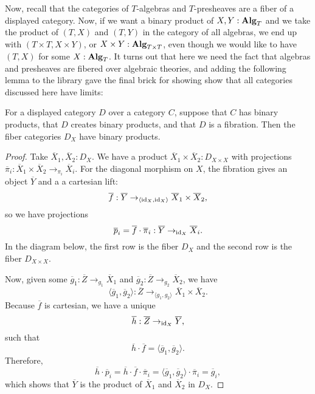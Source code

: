 Now, recall that the categories of $ T $-algebras and $ T $-presheaves are a fiber of a displayed category. Now, if we want a binary product of $ X, Y : \mathbf{Alg}_{T} $ and we take the product of $ (T, X) $ and $ (T, Y) $ in the category of all algebras, we end up with $ (T \times T, X \times Y) $, or $ X \times Y : \mathbf{Alg}_{T \times T} $, even though we would like to have $ (T, X) $ for some $ X : \mathbf{Alg}_{T} $. It turns out that here we need the fact that algebras and presheaves are fibered over algebraic theories, and adding the following lemma to the library gave the final brick for showing show that all categories discussed here have limits:
\begin{lemma}
  For a displayed category $ D $ over a category $ C $, suppose that $ C $ has binary products, that $ D $ creates binary products, and that $ D $ is a fibration. Then the fiber categories $ D_X $ have binary products.
\end{lemma}
\begin{proof}
  Take $ \overline X_1, \overline X_2 : D_X $. We have a product $ \overline X_1 \times \overline X_2 : D_{X \times X} $ with projections $ \overline \pi_i : \overline X_1 \times \overline X_2 \to_{\pi_i} \overline X_i $. For the diagonal morphism on $ X $, the fibration gives an object $ \overline Y $ and a a cartesian lift:
  \[ \overline f : \overline Y \to_{\langle \text{id}_{X}, \text{id}_{X} \rangle} \overline X_1 \times \overline X_2, \]
  so we have projections
  \[ \overline p_i = \overline f \cdot \overline \pi_i : \overline Y \to_{\text{id}_{X}} \overline X_i. \]
  In the diagram below, the first row is the fiber $ D_X $ and the second row is the fiber $ D_{X \times X} $.
  \begin{center}
  \end{center}
  Now, given some $ \overline g_1: \overline Z \to_{g_1} \overline X_1 $ and $ \overline g_2: \overline Z \to_{g_2} \overline X_2 $, we have
  \[ \langle \overline g_1, \overline g_2 \rangle : \overline Z \to_{\langle g_1, g_2 \rangle} \overline X_1 \times \overline X_2. \]
  Because $ \overline f $ is cartesian, we have a unique
  \[ \overline h: \overline Z \to_{\text{id}_{X}} \overline Y, \]
  such that
  \[ \overline h \cdot \overline f = \langle \overline g_1, \overline g_2 \rangle. \]
  Therefore,
  \[ \overline h \cdot \overline p_i = \overline h \cdot \overline f \cdot \overline \pi_i = \langle \overline g_1, \overline g_2 \rangle \cdot \overline \pi_i = \overline g_i, \]
  which shows that $ \overline Y $ is the product of $ \overline X_1 $ and $ \overline X_2 $ in $ D_X $.
\end{proof}

